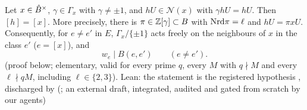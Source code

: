 \begin{lemma}\label{lem:s03-stabfree}
Let $x\in\hat{B}^\times$, $\gamma\in\Gamma_x$ with $\gamma\ne\pm1$, and $hU\in\mathcal N(x)$ with $\gamma hU=hU$. Then $[h]=[x]$. More precisely, there is
$\pi\in\mathbb{Z}[\gamma]\subset B$ with $\mathrm{Nrd}\pi=\ell$ and $hU=\pi xU$. Consequently, for $e\ne e'$ in $E$, $\Gamma_x/\{\pm1\}$ acts freely on the
neighbours of $x$ in the class $e'$ ($e=[x]$), and
\[w_e\mid B(e,e')\qquad(e\ne e').\]
\stproved{} (proof below; elementary, valid for every prime $q$, every $M$ with $q\nmid M$ and every $\ell\nmid qM$, including $\ell\in\{2,3\}$).
Lean: the statement is the registered hypothesis , discharged by
 (\stformal; an external draft, integrated, audited and gated from scratch by our agents)
\end{lemma}
